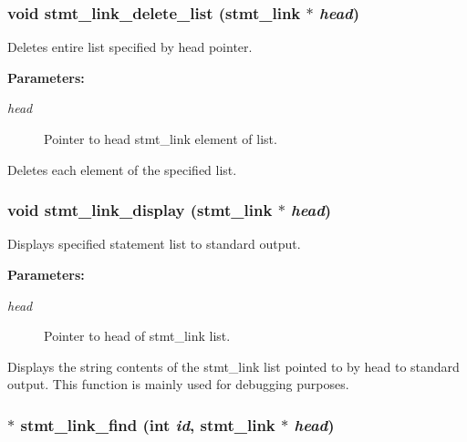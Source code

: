 \subsubsection{\setlength{\rightskip}{0pt plus 5cm}void stmt\_\-link\_\-delete\_\-list ({\bf stmt\_\-link} $\ast$ {\em head})}\label{link_8h_a19}


Deletes entire list specified by head pointer.

\begin{Desc}
\item[{\bf Parameters: }]\par
\begin{description}
\item[
{\em head}]Pointer to head stmt\_\-link element of list.

\end{description}
\end{Desc}
Deletes each element of the specified list. 
\subsubsection{\setlength{\rightskip}{0pt plus 5cm}void stmt\_\-link\_\-display ({\bf stmt\_\-link} $\ast$ {\em head})}\label{link_8h_a7}


Displays specified statement list to standard output.

\begin{Desc}
\item[{\bf Parameters: }]\par
\begin{description}
\item[
{\em head}]Pointer to head of stmt\_\-link list.

\end{description}
\end{Desc}
Displays the string contents of the stmt\_\-link list pointed to by head to standard output. This function is mainly used for debugging purposes. 
\subsubsection{$\ast$ stmt\_\-link\_\-find (int {\em id}, {\bf stmt\_\-link} $\ast$ {\em head})}\label{link_8h_a12}


